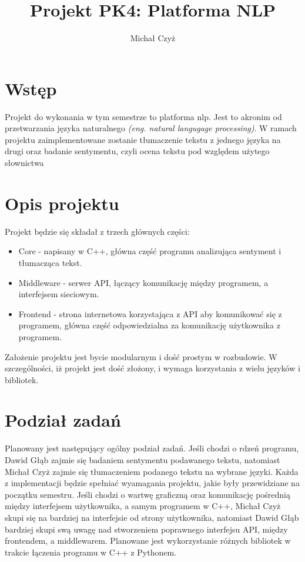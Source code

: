 \documentclass{article}
\title{Projekt PK4: Platforma NLP}
\author{Michał Czyż}
\begin{document}
\maketitle

\section{Wstęp}

Projekt do wykonania w tym semestrze to platforma nlp. Jest to akronim od przetwarzania języka naturalnego \textit{(eng. natural langugage processing)}. W ramach projektu zaimplementowane zostanie tłumaczenie tekstu z jednego języka na drugi oraz badanie sentymentu, czyli ocena tekstu pod względem użytego słownictwa

\section{Opis projektu}

Projekt będzie się składał z trzech głównych części:

\begin{itemize}
  \item Core - napisany w C++, główna część programu analizująca sentyment i tłumacząca tekst.
  \item Middleware - serwer API, łączący komunikację między programem, a interfejsem sieciowym.
  \item Frontend - strona internetowa korzystająca z API aby komunikować się z programem, główna część odpowiedzialna za komunikację użytkownika z programem.
\end{itemize}

Założenie projektu jest bycie modularnym i dość prostym w rozbudowie. W szczególności, iż projekt jest dość złożony, i wymaga korzystania z wielu języków i bibliotek.

\section{Podział zadań}

Planowany jest następujący ogólny podział zadań. Jeśli chodzi o rdzeń programu, Dawid Głąb zajmie się badaniem sentymentu podawanego tekstu, natomiast Michał Czyż zajmie się tłumaczeniem podanego tekstu na wybrane języki. Każda z implementacji będzie spełniać wyamagania projektu, jakie były przewidziane na początku semestru. Jeśli chodzi o wartwę graficzną oraz komunikację pośrednią między interfejsem użytkownika, a samym programem w C++, Michał Czyż skupi się na bardziej na interfejsie od strony użytkownika, natomiast Dawid Głąb bardziej skupi swą uwagę nad stworzeniem poprawnego interfejsu API, między frontendem, a middlewarem. Planowane jest wykorzystanie różnych bibliotek w trakcie łączenia programu w C++ z Pythonem. 
\end{document}
